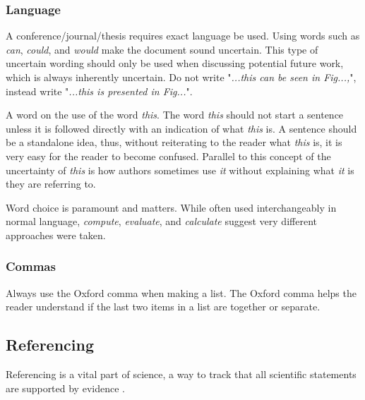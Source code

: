 \subsubsection{Language}

A conference/journal/thesis requires exact language be used. 
Using words such as \textit{can}, \textit{could}, and \textit{would} make the document sound uncertain. 
This type of uncertain wording should only be used when discussing potential future work, which is always inherently uncertain. 
Do not write "\textit{...this can be seen in Fig...,}", instead write "\textit{...this is presented in Fig...}".

A word on the use of the word \textit{this}. 
The word \textit{this} should not start a sentence unless it is followed directly with an indication of what \textit{this} is. 
A sentence should be a standalone idea, thus, without reiterating to the reader what \textit{this} is, it is very easy for the reader to become confused. 
Parallel to this concept of the uncertainty of \textit{this} is how authors sometimes use \textit{it} without explaining what \textit{it} is they are referring to. 

Word choice is paramount and matters. While often used interchangeably in normal language, \textit{compute}, \textit{evaluate}, and \textit{calculate} suggest very different approaches were taken. 


\subsubsection{Commas}

Always use the Oxford comma when making a list. The Oxford comma helps the reader understand if the last two items in a list are together or separate. 

\subsection{Referencing}
Referencing is a vital part of science, a way to track that all scientific statements are supported by evidence \cite{referncingVirtues}. 